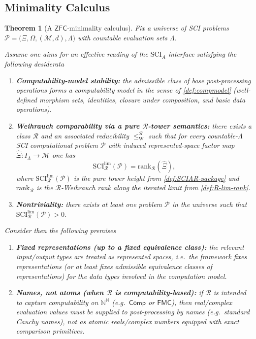 \documentclass{lmcs} %
\theoremstyle{plain}
\theoremstyle{plain}
\newtheorem{theorem}{Theorem}[section]
\theoremstyle{definition}
\theoremstyle{remark}
\theoremstyle{definition}
\theoremstyle{remark}
\numberwithin{equation}{section}
\newcommand{\NN}{\mathbb{N}}
\newcommand{\Lim}{\operatorname{lim}}
\begin{document}
\subsection{Minimality Calculus}\label{sec:minimality-calculus}
\begin{theorem}[A $\mathsf{ZFC}$-minimality calculus]\label{thm:minimality}
Fix a universe of SCI problems $\mathcal P=\bigl( \Xi,\Omega,(\mathcal M,d),\Lambda \bigr)$ with countable
evaluation sets $\Lambda$.

Assume one aims for an \textit{effective} reading of the $\mathrm{SCI}_A$ interface satisfying the following
desiderata
\begin{enumerate}
\item[(D1)] \textbf{Computability-model stability:}
the admissible class of base post-processing operations forms a computability model
in the sense of \cref{def:compmodel} (well-defined morphism sets, identities, closure under
composition, and basic data operations).

\item[(D2)] \textbf{Weihrauch comparability via a pure $\mathcal R$-tower semantics:}
there exists a class $\mathcal R$ and an associated reducibility
$\le_{\mathrm W}^{\mathcal R}$ such that for every countable-$\Lambda$
SCI computational problem $\mathcal{P}$ with induced represented-space factor map
$\widehat{\Xi}:I_\Lambda \to \mathcal{M}$ one has
\[
\mathrm{SCI}^{\Lim}_\mathcal R(\mathcal{P})=\mathrm{rank}_{\mathcal R}(\widehat{\Xi}),
\]
where $\mathrm{SCI}^{\Lim}_\mathcal R(\mathcal{P})$ is the pure tower height from
\cref{def:SCIAR-package} and $\mathrm{rank}_{\mathcal R}$ is the
$\mathcal R$-Weihrauch rank along the iterated limit from \cref{def:R-lim-rank}.

\item[(D3)] \textbf{Nontriviality:}
there exists at least one problem $\mathcal P$ in the universe such that
$\mathrm{SCI}^{\Lim}_\mathcal R(\mathcal P)>0$.
\end{enumerate}

Consider then the following premises
\begin{enumerate}
\item[(P1)] \textbf{Fixed representations (up to a fixed equivalence class):}
the relevant input/output types are treated as represented spaces, i.e.\ the framework fixes
representations (or at least fixes admissible equivalence classes of representations) for the
data types involved in the computation model.

\item[(P2)] \textbf{Names, not atoms (when $\mathcal R$ is computability-based):}
if $\mathcal R$ is intended to capture computability on $\NN^\NN$ (e.g.\ $\mathsf{Comp}$ or $\mathsf{FMC}$),
then real/complex evaluation values must be supplied to post-processing by \textit{names}
(e.g.\ standard Cauchy names), not as atomic reals/complex numbers equipped with exact comparison
primitives.


\end{enumerate}
\end{theorem}
\end{document}

